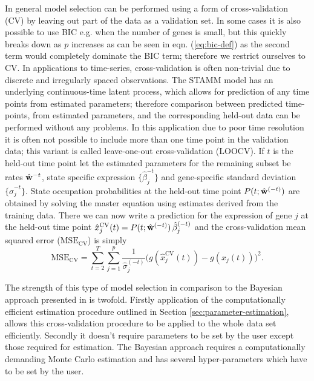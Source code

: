 In general model selection can be performed using a form of cross-validation (CV) by leaving out part of the data as a
validation set. In some cases it is also possible to use BIC  e.g. when the number of genes is small, but this quickly
breaks down as $p$ increases as can be seen in eqn. (\ref{eq:bic-def}) as the second term would completely dominate the
BIC term; therefore we restrict ourselves to CV. In applications to time-series, cross-validation is often non-trivial due to discrete and irregularly spaced observations. The STAMM model has an underlying continuous-time latent process, which allows for prediction of any time points from estimated parameters; therefore comparison between predicted time-points, from estimated parameters, and the corresponding held-out data can be performed without any problems. In this application due to poor time resolution it is often not possible to include more than one time point in the validation data; this variant is called leave-one-out cross-validation (LOOCV). If $t$ is the held-out time point let the estimated parameters for the remaining subset be rates $\hat{\bf{w}}^{-t}$, state specific expression $\lbrace \hat{\beta}_j^{-t} \rbrace$ and gene-specific standard deviation $\lbrace \hat{\sigma}_j^{-t} \rbrace$. State occupation probabilities at the held-out time point  $P(t; \hat{\bf{w}}^{(-t)})$ are obtained by solving the master equation using estimates derived from the training data. There we can now write a prediction for the expression of gene $j$ at the held-out time point $\hat{x}^{\mathrm{CV}}_j(t) = P(t; \hat{\bf{w}}^{(-t)})\, \hat{\beta}_j^{(-t)}$ and the cross-validation 
mean squared error ($\mathrm{MSE_{CV}}$) is simply
\begin{equation}
  \mathrm{MSE_{CV}}  =  \sum_{t=2}^T \sum_{j=1}^p \frac{1}{\hat{\sigma}_j^{(-t)}}\bigl( g(\hat{x}^{\mathrm{CV}}_j(t)) - g(x_j(t)) \bigr)^2.
  \label{eq:mse-cv}
\end{equation}

The strength of this type of model selection in comparison to the Bayesian approach presented in \cite{Armond:2013} is twofold. Firstly application of the computationally efficient estimation procedure outlined in Section \ref{sec:parameter-estimation}, allows this cross-validation procedure to be applied to the whole data set efficiently. Secondly it doesn't require parameters to be set by the user except those required for estimation. The Bayesian approach requires a computationally demanding Monte Carlo estimation and has several hyper-parameters which have to be set by the user. 

